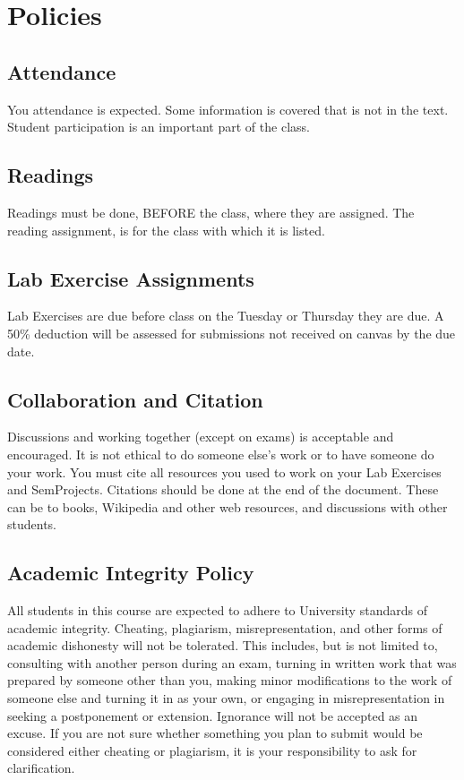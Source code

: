 \documentclass[10pt]{article} %
\begin{document}
\section{Policies}

  \subsection{Attendance}

    You attendance is expected.
    Some information is covered that is not in the text.
    Student participation is an important part of the class.

  \subsection{Readings}

    Readings must be done, BEFORE the class, where they are assigned.
    The reading assignment, is for the class with which it is listed.

  \subsection{Lab Exercise Assignments}

    Lab Exercises are due before class on the Tuesday or Thursday they are due.
    A 50\% deduction will be assessed for submissions not received on canvas by the due date.

  \subsection{Collaboration and Citation}

    Discussions and working together (except on exams) is acceptable and encouraged.
    It is not ethical to do someone else's work or to have someone do your work.
    You must cite all resources you used to work on your Lab Exercises and SemProjects.
    Citations should be done at the end of the document.
    These can be to books, Wikipedia and other web resources, and discussions with other students.

  \subsection{Academic Integrity Policy}

    All students in this course are expected to adhere to University standards of academic integrity. Cheating, plagiarism, misrepresentation, and other forms of academic dishonesty will not be tolerated.
    This includes, but is not limited to, consulting with another person during an exam, turning in written work that was prepared by someone other than you, making minor modifications to the work of someone else and turning it in as your own, or engaging in misrepresentation in seeking a postponement or extension.
    Ignorance will not be accepted as an excuse.
    If you are not sure whether something you plan to submit would be considered either cheating or plagiarism, it is your responsibility to ask for clarification.
\end{document}
